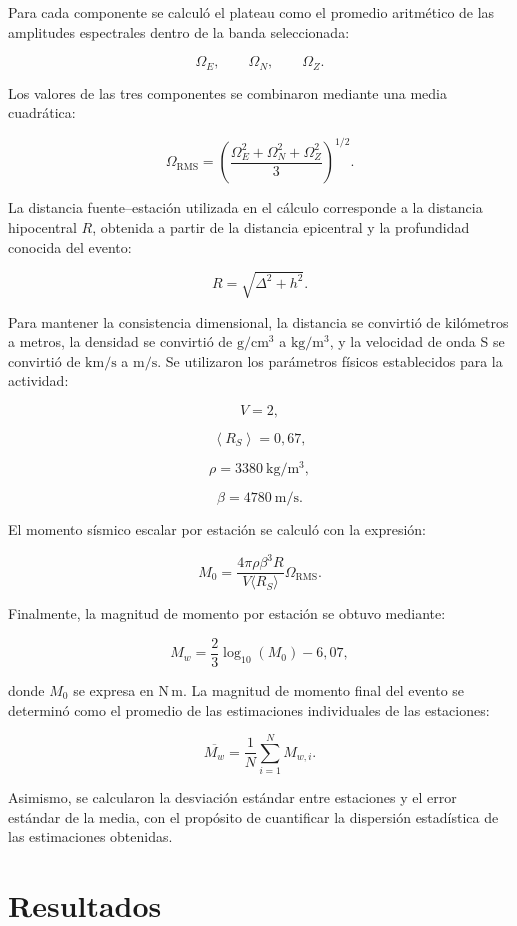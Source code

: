 \documentclass[a4paper,12pt]{article} %
\numberwithin{equation}{section} %
\numberwithin{figure}{section} %
\begin{document}
Para cada componente se calculó el plateau como el promedio aritmético de las amplitudes espectrales dentro de la banda seleccionada:

\[
\Omega_{E}, \qquad
\Omega_{N}, \qquad
\Omega_{Z}.
\]

Los valores de las tres componentes se combinaron mediante una media cuadrática:

\[
\Omega_{\mathrm{RMS}} =
\left(
\frac{
\Omega_E^2+\Omega_N^2+\Omega_Z^2
}{3}
\right)^{1/2}.
\]

La distancia fuente--estación utilizada en el cálculo corresponde a la distancia hipocentral \(R\), obtenida a partir de la distancia epicentral y la profundidad conocida del evento:

\[
R =
\sqrt{\Delta^2+h^2}.
\]

Para mantener la consistencia dimensional, la distancia se convirtió de kilómetros a metros, la densidad se convirtió de \(\mathrm{g/cm^3}\) a \(\mathrm{kg/m^3}\), y la velocidad de onda S se convirtió de \(\mathrm{km/s}\) a \(\mathrm{m/s}\). Se utilizaron los parámetros físicos establecidos para la actividad:

\[
V = 2,
\]

\[
\left< R_S \right> = 0{,}67,
\]

\[
\rho = 3380~\mathrm{kg/m^3},
\]

\[
\beta = 4780~\mathrm{m/s}.
\]

El momento sísmico escalar por estación se calculó con la expresión:

\[
M_0 =  \frac{4\pi\rho\beta^3R}{ V\langle R_S \rangle } \Omega_{\mathrm{RMS}}.
\]

Finalmente, la magnitud de momento por estación se obtuvo mediante:

\[
M_w =
\frac{2}{3}\log_{10}(M_0)-6{,}07,
\]

donde \(M_0\) se expresa en \(\mathrm{N\,m}\). La magnitud de momento final del evento se determinó como el promedio de las estimaciones individuales de las estaciones:

\[
\overline{M_w} =
\frac{1}{N}
\sum_{i=1}^{N}M_{w,i}.
\]

Asimismo, se calcularon la desviación estándar entre estaciones y el error estándar de la media, con el propósito de cuantificar la dispersión estadística de las estimaciones obtenidas.
\newpage






\section{Resultados}
\end{document}
